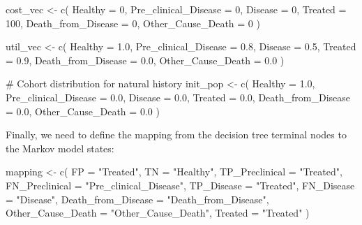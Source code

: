 \documentclass[
]{article}
\newenvironment{Shaded}{\begin{snugshade}}{\end{snugshade}}
\newcommand{\AttributeTok}[1]{\textcolor[rgb]{0.40,0.45,0.13}{#1}}
\newcommand{\CommentTok}[1]{\textcolor[rgb]{0.37,0.37,0.37}{#1}}
\newcommand{\DecValTok}[1]{\textcolor[rgb]{0.68,0.00,0.00}{#1}}
\newcommand{\FloatTok}[1]{\textcolor[rgb]{0.68,0.00,0.00}{#1}}
\newcommand{\FunctionTok}[1]{\textcolor[rgb]{0.28,0.35,0.67}{#1}}
\newcommand{\NormalTok}[1]{\textcolor[rgb]{0.00,0.23,0.31}{#1}}
\newcommand{\OtherTok}[1]{\textcolor[rgb]{0.00,0.23,0.31}{#1}}
\newcommand{\StringTok}[1]{\textcolor[rgb]{0.13,0.47,0.30}{#1}}
\begin{document}
\begin{Shaded}
\begin{Highlighting}[]
\NormalTok{cost\_vec }\OtherTok{\textless{}{-}} \FunctionTok{c}\NormalTok{(}
  \AttributeTok{Healthy              =} \DecValTok{0}\NormalTok{,}
  \AttributeTok{Pre\_clinical\_Disease =} \DecValTok{0}\NormalTok{,}
  \AttributeTok{Disease              =} \DecValTok{0}\NormalTok{,}
  \AttributeTok{Treated              =} \DecValTok{100}\NormalTok{,}
  \AttributeTok{Death\_from\_Disease   =} \DecValTok{0}\NormalTok{,}
  \AttributeTok{Other\_Cause\_Death    =} \DecValTok{0}
\NormalTok{)}

\NormalTok{util\_vec }\OtherTok{\textless{}{-}} \FunctionTok{c}\NormalTok{(}
  \AttributeTok{Healthy              =} \FloatTok{1.0}\NormalTok{,}
  \AttributeTok{Pre\_clinical\_Disease =} \FloatTok{0.8}\NormalTok{,}
  \AttributeTok{Disease              =} \FloatTok{0.5}\NormalTok{,}
  \AttributeTok{Treated              =} \FloatTok{0.9}\NormalTok{,}
  \AttributeTok{Death\_from\_Disease   =} \FloatTok{0.0}\NormalTok{,}
  \AttributeTok{Other\_Cause\_Death    =} \FloatTok{0.0}
\NormalTok{)}

\CommentTok{\# Cohort distribution for natural history}
\NormalTok{init\_pop }\OtherTok{\textless{}{-}} \FunctionTok{c}\NormalTok{(}
  \AttributeTok{Healthy              =} \FloatTok{1.0}\NormalTok{,}
  \AttributeTok{Pre\_clinical\_Disease =} \FloatTok{0.0}\NormalTok{,}
  \AttributeTok{Disease              =} \FloatTok{0.0}\NormalTok{,}
  \AttributeTok{Treated              =} \FloatTok{0.0}\NormalTok{,}
  \AttributeTok{Death\_from\_Disease   =} \FloatTok{0.0}\NormalTok{,}
  \AttributeTok{Other\_Cause\_Death    =} \FloatTok{0.0}
\NormalTok{)}
\end{Highlighting}
\end{Shaded}

Finally, we need to define the mapping from the decision tree terminal
nodes to the Markov model states:

\begin{Shaded}
\begin{Highlighting}[]
\NormalTok{mapping }\OtherTok{\textless{}{-}} \FunctionTok{c}\NormalTok{(}
  \AttributeTok{FP                 =} \StringTok{"Treated"}\NormalTok{,}
  \AttributeTok{TN                 =} \StringTok{"Healthy"}\NormalTok{,}
  \AttributeTok{TP\_Preclinical     =} \StringTok{"Treated"}\NormalTok{,}
  \AttributeTok{FN\_Preclinical     =} \StringTok{"Pre\_clinical\_Disease"}\NormalTok{,}
  \AttributeTok{TP\_Disease         =} \StringTok{"Treated"}\NormalTok{,}
  \AttributeTok{FN\_Disease         =} \StringTok{"Disease"}\NormalTok{,}
  \AttributeTok{Death\_from\_Disease =} \StringTok{"Death\_from\_Disease"}\NormalTok{,}
  \AttributeTok{Other\_Cause\_Death  =} \StringTok{"Other\_Cause\_Death"}\NormalTok{,}
  \AttributeTok{Treated            =} \StringTok{"Treated"}
\NormalTok{)}
\end{Highlighting}
\end{Shaded}
\end{document}

